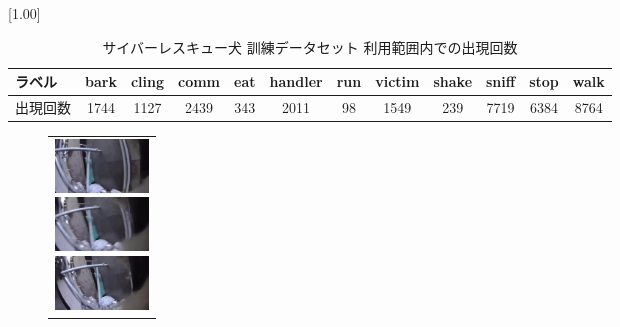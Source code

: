 \begin{table}[tb]
 \centering
 \caption{サイバーレスキュー犬 訓練データセット 利用範囲内での出現回数}\label{cyberdataset_label}
 \scalebox{1.00}[1.00]{
  \begin{tabular}{|l||c|c|c|c|c|c|c|c|c|c|c|}
   \hline \hline
   ラベル　& bark&cling&comm&eat&handler&run&victim&shake&sniff&stop&walk \\ \hline
   出現回数& 1744& 1127&2439&343&  2011& 98&  1549&  239& 7719&6384&8764 \\ \hline
  \end{tabular}
 }

\end{table}

\begin{figure}[htbp]
    \begin{tabular}{l}
      \begin{minipage}{0.165\hsize}
        \begin{center}
          \includegraphics[clip, width=2.5cm]{./Figures/still_bark1.eps}
        \end{center}
      \end{minipage}
      \begin{minipage}{0.165\hsize}
        \begin{center}
          \includegraphics[clip, width=2.5cm]{./Figures/still_bark2.eps}
        \end{center}
      \end{minipage}
      \begin{minipage}{0.165\hsize}
        \begin{center}
          \includegraphics[clip, width=2.5cm]{./Figures/still_bark3.eps}
        \end{center}
      \end{minipage}
      \begin{minipage}{0.165\hsize}
        \begin{center}

\end{center}
\end{minipage}
\end{tabular}
\end{figure}
